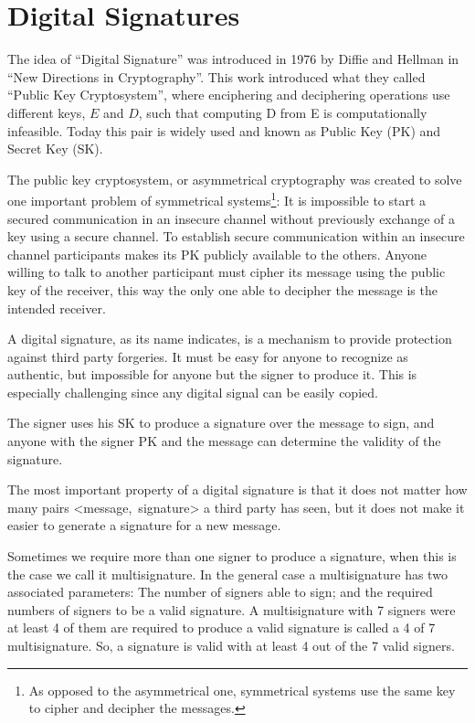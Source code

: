 \section{Digital Signatures}
The idea of ``Digital Signature'' was introduced in 1976 by Diffie and
  Hellman in ``New Directions in Cryptography''\cite{diffie1976new}. This work
  introduced what they called ``Public Key Cryptosystem'', where enciphering and
  deciphering operations use different keys, $E$ and $D$, such that computing D
  from E is computationally infeasible.
Today this pair is widely used and known as Public Key (PK) and Secret Key (SK).

The public key cryptosystem, or asymmetrical cryptography was created to solve
  one important problem of symmetrical systems\footnote{As opposed to the
  asymmetrical one, symmetrical systems use the same key to cipher and decipher
  the messages.}: It is impossible to start a secured communication in an
  insecure channel without previously exchange of a key using a secure channel.
To establish secure communication within an insecure channel participants makes
  its PK publicly available to the others.
Anyone willing to talk to another participant must cipher its message using the
  public key of the receiver, this way the only one able to decipher the message
  is the intended receiver.

A digital signature, as its name indicates, is a mechanism to provide protection
  against third party forgeries. It must be easy for anyone to recognize as
  authentic, but impossible for anyone but the signer to produce it. This is
  especially challenging since any digital signal can be easily copied.

The signer uses his SK to produce a signature over the message to sign, and
  anyone with the signer PK and the message can determine the validity of the
  signature.

The most important property of a digital signature is that it does not matter how
  many pairs \mbox{\textless message, signature\textgreater} a third party has
  seen, but it does not make it easier to generate a signature for a new
  message.

Sometimes we require more than one signer to produce a signature, when this is
  the case we call it multisignature.
In the general case a multisignature has two associated parameters: The number
  of signers able to sign; and the required numbers of signers to be a valid
  signature.
A multisignature with 7 signers were at least 4 of them are required to produce
  a valid signature is called a 4 of 7 multisignature.
So, a signature is valid with at least 4 out of the 7 valid signers.
